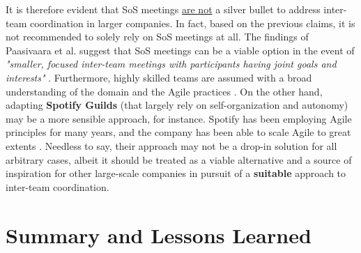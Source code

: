 \documentclass[conference]{IEEEtran}
\begin{document}
It is therefore evident that SoS meetings \underline{are not} a silver bullet
to address inter-team coordination in larger companies. In fact, based on the
previous claims, it is not recommended to solely rely on SoS meetings at all.
The findings of Paasivaara et al. suggest that SoS meetings can be a viable
option in the event of \textit{"smaller, focused inter-team meetings with
participants having joint goals and interests"} \cite{Paasivaara2012}.
Furthermore, highly skilled teams are assumed with a broad understanding of the
domain and the Agile practices \cite{Sutherland2007}. On the other hand,
adapting \textbf{Spotify Guilds} (that largely rely on self-organization and
autonomy) \cite{Smite2019} may be a more sensible approach, for instance.
Spotify has been employing Agile principles for many years, and the company has
been able to scale Agile to great extents \cite{Alqudah2016}. Needless to say,
their approach may not be a drop-in solution for all arbitrary cases, albeit it
should be treated as a viable alternative and a source of inspiration for other
large-scale companies in pursuit of a \textbf{suitable} approach to inter-team
coordination.

\section{Summary and Lessons Learned}
\label{sec:summary}



\end{document}
